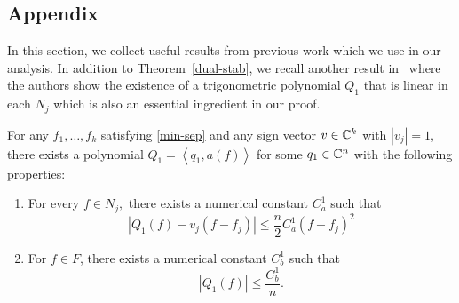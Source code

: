 \begin{subappendices} %
	
\section{Appendix}
\label{apx:collection}

In this section, we collect useful results from previous work which we use in
our analysis. In addition to Theorem~\ref{dual-stab}, we recall another result
in~\cite{cg_noisy} where the authors show the existence of a trigonometric
polynomial $Q_1$ that is linear in each $N_j$ which is also an essential
ingredient in our proof.

\begin{theorem}
\label{dual-lin}
For any $f_1, \ldots, f_k$ satisfying \eqref{min-sep} and any sign vector $v \in \mathbb{C}^k$ with $|v_j|=1$, there exists a polynomial $Q_1 = \left<q_1, a(f)\right>$ for some $q_1 \in \mathbb{C}^n$ with the following properties: 
\begin{enumerate}
\item For every $f \in N_j,$ there exists a numerical constant $C_a^1$ such that
\begin{equation}
\label{ca1}
|Q_1(f) - v_j(f-f_j)| \leq \frac{n}{2} C_a^1 (f-f_j)^2
\end{equation}
\item For $f \in F$, there exists a numerical constant $C_b^1$ such that
\begin{equation}
\label{cb1}
|Q_1(f)| \leq \frac{C_b^1}{n}.
\end{equation}
\end{enumerate}
\end{theorem}


\end{subappendices}
